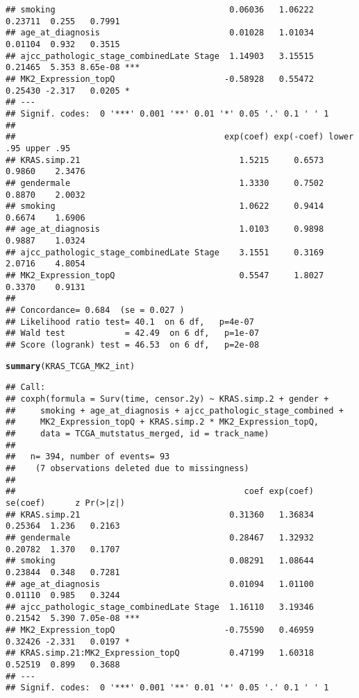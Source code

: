 \documentclass{article}\usepackage[]{graphicx}\usepackage[]{color}
\makeatletter
\newcommand{\hlstd}[1]{\textcolor[rgb]{0.345,0.345,0.345}{#1}}%
\newcommand{\hlkwd}[1]{\textcolor[rgb]{0.737,0.353,0.396}{\textbf{#1}}}%
\newenvironment{kframe}{%
 \def\at@end@of@kframe{}%
 \ifinner\ifhmode%
  \def\at@end@of@kframe{\end{minipage}}%
  \begin{minipage}{\columnwidth}%
 \fi\fi%
 \def\FrameCommand##1{\hskip\@totalleftmargin \hskip-\fboxsep
 \colorbox{shadecolor}{##1}\hskip-\fboxsep
     \hskip-\linewidth \hskip-\@totalleftmargin \hskip\columnwidth}%
 \MakeFramed {\advance\hsize-\width
   \@totalleftmargin\z@ \linewidth\hsize
   \@setminipage}}%
 {\par\unskip\endMakeFramed%
 \at@end@of@kframe}
\newenvironment{knitrout}{}{} %
\makeatother
\begin{document}
\begin{knitrout}
\begin{kframe}
\begin{verbatim}
## smoking                                   0.06036   1.06222  0.23711  0.255   0.7991    
## age_at_diagnosis                          0.01028   1.01034  0.01104  0.932   0.3515    
## ajcc_pathologic_stage_combinedLate Stage  1.14903   3.15515  0.21465  5.353 8.65e-08 ***
## MK2_Expression_topQ                      -0.58928   0.55472  0.25430 -2.317   0.0205 *  
## ---
## Signif. codes:  0 '***' 0.001 '**' 0.01 '*' 0.05 '.' 0.1 ' ' 1
## 
##                                          exp(coef) exp(-coef) lower .95 upper .95
## KRAS.simp.21                                1.5215     0.6573    0.9860    2.3476
## gendermale                                  1.3330     0.7502    0.8870    2.0032
## smoking                                     1.0622     0.9414    0.6674    1.6906
## age_at_diagnosis                            1.0103     0.9898    0.9887    1.0324
## ajcc_pathologic_stage_combinedLate Stage    3.1551     0.3169    2.0716    4.8054
## MK2_Expression_topQ                         0.5547     1.8027    0.3370    0.9131
## 
## Concordance= 0.684  (se = 0.027 )
## Likelihood ratio test= 40.1  on 6 df,   p=4e-07
## Wald test            = 42.49  on 6 df,   p=1e-07
## Score (logrank) test = 46.53  on 6 df,   p=2e-08
\end{verbatim}
\begin{alltt}
\hlkwd{summary}\hlstd{(KRAS_TCGA_MK2_int)}
\end{alltt}
\begin{verbatim}
## Call:
## coxph(formula = Surv(time, censor.2y) ~ KRAS.simp.2 + gender + 
##     smoking + age_at_diagnosis + ajcc_pathologic_stage_combined + 
##     MK2_Expression_topQ + KRAS.simp.2 * MK2_Expression_topQ, 
##     data = TCGA_mutstatus_merged, id = track_name)
## 
##   n= 394, number of events= 93 
##    (7 observations deleted due to missingness)
## 
##                                              coef exp(coef) se(coef)      z Pr(>|z|)    
## KRAS.simp.21                              0.31360   1.36834  0.25364  1.236   0.2163    
## gendermale                                0.28467   1.32932  0.20782  1.370   0.1707    
## smoking                                   0.08291   1.08644  0.23844  0.348   0.7281    
## age_at_diagnosis                          0.01094   1.01100  0.01110  0.985   0.3244    
## ajcc_pathologic_stage_combinedLate Stage  1.16110   3.19346  0.21542  5.390 7.05e-08 ***
## MK2_Expression_topQ                      -0.75590   0.46959  0.32426 -2.331   0.0197 *  
## KRAS.simp.21:MK2_Expression_topQ          0.47199   1.60318  0.52519  0.899   0.3688    
## ---
## Signif. codes:  0 '***' 0.001 '**' 0.01 '*' 0.05 '.' 0.1 ' ' 1

\end{verbatim}
\end{kframe}
\end{knitrout}
\end{document}
